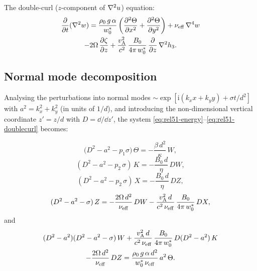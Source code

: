 The double-curl ($z$-component of $\nabla^{2}u$) equation:
\begin{multline}
  \frac{\partial}{\partial t}(\nabla^{2}w)
  = \frac{\rho_{0}\,g\,\alpha}{w^{*}_{0}}
    \left(\frac{\partial^{2}\Theta}{\partial x^{2}}
    +\frac{\partial^{2}\Theta}{\partial y^{2}}\right)
  + \nu_{\mathrm{eff}}\,\nabla^{4}w\\
  - 2\Omega\,\frac{\partial\zeta}{\partial z}
  + \frac{v_{\mathrm{A}}^{2}}{c^{2}}\,
    \frac{B_{0}}{4\pi\,w^{*}_{0}}\,
    \frac{\partial}{\partial z}\,\nabla^{2}h_{3}.
  \label{eq:rel51-doublecurl}
\end{multline}

\subsection{Normal mode decomposition}
\label{sec:normal-modes}

Analysing the perturbations into normal modes
$\sim \exp[\mathrm{i}(k_{x}x + k_{y}y) + \sigma t/d^{2}]$
with $a^{2} = k_{x}^{2}+k_{y}^{2}$ (in units of $1/d$), and
introducing the non-dimensional vertical coordinate $z' = z/d$
with $D = \dd/\dd z'$, the system
\eqref{eq:rel51-energy}--\eqref{eq:rel51-doublecurl} becomes:

\begin{equation}
  \bigl(D^{2}-a^{2}-p_{1}\sigma\bigr)\,\Theta
  = -\frac{\beta\,d^{2}}{\kappa}\,W,
  \label{eq:rel51-35}
\end{equation}
\begin{equation}
  (D^{2}-a^{2}-p_{2}\,\sigma)\,K
  = -\frac{B_{0}\,d}{\eta}\,DW,
  \label{eq:rel51-36}
\end{equation}
\begin{equation}
  (D^{2}-a^{2}-p_{2}\,\sigma)\,X
  = -\frac{B_{0}\,d}{\eta}\,DZ,
  \label{eq:rel51-37}
\end{equation}
\begin{equation}
  (D^{2}-a^{2}-\sigma)\,Z
  = -\frac{2\Omega\,d^{2}}{\nu_{\mathrm{eff}}}\,DW
  - \frac{v_{\mathrm{A}}^{2}\,d}{c^{2}\,\nu_{\mathrm{eff}}}\,
    \frac{B_{0}}{4\pi\,w^{*}_{0}}\,DX,
  \label{eq:rel51-38}
\end{equation}
and
\begin{multline}
  (D^{2}-a^{2})(D^{2}-a^{2}-\sigma)\,W
  + \frac{v_{\mathrm{A}}^{2}\,d}{c^{2}\,\nu_{\mathrm{eff}}}\,
    \frac{B_{0}}{4\pi\,w^{*}_{0}}\,
    D(D^{2}-a^{2})\,K\\
  - \frac{2\Omega\,d^{2}}{\nu_{\mathrm{eff}}}\,DZ
  = \frac{\rho_{0}\,g\,\alpha\,d^{2}}
         {w^{*}_{0}\,\nu_{\mathrm{eff}}}\,a^{2}\,\Theta.
  \label{eq:rel51-39}
\end{multline}

